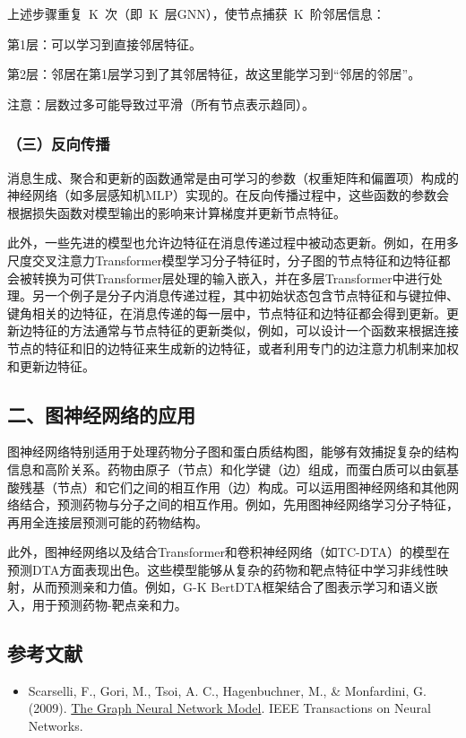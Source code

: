 上述步骤重复~K~次（即~K~层GNN），使节点捕获~K~阶邻居信息：

第1层：可以学习到直接邻居特征。

第2层：邻居在第1层学习到了其邻居特征，故这里能学习到``邻居的邻居''。

注意：层数过多可能导致过平滑（所有节点表示趋同）。

\hypertarget{ux4e09ux53cdux5411ux4f20ux64ad}{%
\subsubsection{（三）反向传播}\label{ux4e09ux53cdux5411ux4f20ux64ad}}

消息生成、聚合和更新的函数通常是由可学习的参数（权重矩阵和偏置项）构成的神经网络（如多层感知机MLP）实现的。在反向传播过程中，这些函数的参数会根据损失函数对模型输出的影响来计算梯度并更新节点特征。

此外，一些先进的模型也允许边特征在消息传递过程中被动态更新。例如，在用多尺度交叉注意力Transformer模型学习分子特征时，分子图的节点特征和边特征都会被转换为可供Transformer层处理的输入嵌入，并在多层Transformer中进行处理。另一个例子是分子内消息传递过程，其中初始状态包含节点特征和与键拉伸、键角相关的边特征，在消息传递的每一层中，节点特征和边特征都会得到更新。更新边特征的方法通常与节点特征的更新类似，例如，可以设计一个函数来根据连接节点的特征和旧的边特征来生成新的边特征，或者利用专门的边注意力机制来加权和更新边特征。

\hypertarget{ux4e8cux56feux795eux7ecfux7f51ux7edcux7684ux5e94ux7528}{%
\subsection{二、图神经网络的应用}\label{ux4e8cux56feux795eux7ecfux7f51ux7edcux7684ux5e94ux7528}}

图神经网络特别适用于处理药物分子图和蛋白质结构图，能够有效捕捉复杂的结构信息和高阶关系。药物由原子（节点）和化学键（边）组成，而蛋白质可以由氨基酸残基（节点）和它们之间的相互作用（边）构成。可以运用图神经网络和其他网络结合，预测药物与分子之间的相互作用。例如，先用图神经网络学习分子特征，再用全连接层预测可能的药物结构。

此外，图神经网络以及结合Transformer和卷积神经网络（如TC-DTA）的模型在预测DTA方面表现出色。这些模型能够从复杂的药物和靶点特征中学习非线性映射，从而预测亲和力值。例如，G-K BertDTA框架结合了图表示学习和语义嵌入，用于预测药物-靶点亲和力。

\hypertarget{ux53c2ux8003ux6587ux732e-39}{%
\subsection{参考文献}\label{ux53c2ux8003ux6587ux732e-39}}

\begin{itemize}
\tightlist
\item
  Scarselli, F., Gori, M., Tsoi, A. C., Hagenbuchner, M., \& Monfardini, G. (2009). \href{https://doi.org/10.1109/TNN.2008.2005605}{The Graph Neural Network Model}. IEEE Transactions on Neural Networks.
\end{itemize}

\clearpage
